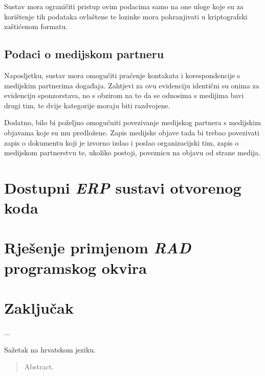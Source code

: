 \documentclass[times, utf8, diplomski]{fer}
\begin{document}
Sustav mora ograničiti pristup ovim podacima samo na one uloge koje su za
korištenje tih podataka ovlaštene te lozinke mora pohranjivati u kriptografski
zaštićenom formatu.

\section{Podaci o medijskom partneru}

Naposljetku, sustav mora omogućiti praćenje kontakata i korespondencije s
medijskim partnerima događaja. Zahtjevi za ovu evidenciju identični su onima za
evidenciju sponzorstava, no s obzirom na to da se odnosima s medijima bavi drugi
tim, te dvije kategorije moraju biti razdvojene.

Dodatno, bilo bi poželjno omogućuiti povezivanje medijskog partnera s medijskim
objavama koje su mu predložene. Zapis medijske objave tada bi trebao povezivati
zapis o dokumentu koji je izvorno izdao i poslao organizacijski tim, zapis o
medijskom partnerstvu te, ukoliko postoji, poveznicu na objavu od strane medija.

\chapter{Dostupni \emph{ERP} sustavi otvorenog koda}
\chapter{Rješenje primjenom \emph{RAD} programskog okvira}

\chapter{Zaključak}
...



\begin{sazetak}
Sažetak na hrvatskom jeziku.

\end{sazetak}

\begin{abstract}
Abstract.

\end{abstract}
\end{document}

